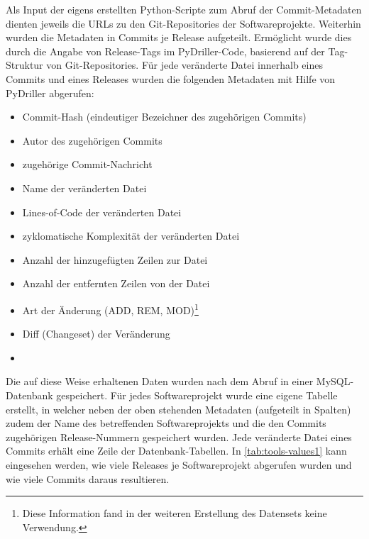 Als Input der eigens erstellten Python-Scripte zum Abruf der Commit-Metadaten dienten jeweils die URLs zu den Git-Repositories der Softwareprojekte. Weiterhin wurden die Metadaten in Commits je Release aufgeteilt. Ermöglicht wurde dies durch die Angabe von Release-Tags im PyDriller-Code, basierend auf der Tag-Struktur von Git-Repositories. Für jede veränderte Datei innerhalb eines Commits und eines Releases wurden die folgenden Metadaten mit Hilfe von PyDriller abgerufen:

\begin{multicols}{2}
\begin{itemize}
\setlength{\itemsep}{-2pt}
\item Commit-Hash (eindeutiger Bezeichner des zugehörigen Commits)
\item Autor des zugehörigen Commits
\item zugehörige Commit-Nachricht
\item Name der veränderten Datei
\item Lines-of-Code der veränderten Datei
\item zyklomatische Komplexität der veränderten Datei
\item Anzahl der hinzugefügten Zeilen zur Datei
\item Anzahl der entfernten Zeilen von der Datei
\item Art der Änderung (ADD, REM, MOD)\footnote{Diese Information fand in der weiteren Erstellung des Datensets keine Verwendung.}
\item Diff (Changeset) der Veränderung
\item[\vspace{\fill}]
\end{itemize}
\end{multicols}

Die auf diese Weise erhaltenen Daten wurden nach dem Abruf in einer MySQL-Datenbank gespeichert. Für jedes Softwareprojekt wurde eine eigene Tabelle erstellt, in welcher neben der oben stehenden Metadaten (aufgeteilt in Spalten) zudem der Name des betreffenden Softwareprojekts und die den Commits zugehörigen Release-Nummern gespeichert wurden. Jede veränderte Datei eines Commits erhält eine Zeile der Datenbank-Tabellen. In \autoref{tab:tools-values1} kann eingesehen werden, wie viele Releases je Softwareprojekt abgerufen wurden und wie viele Commits daraus resultieren.

